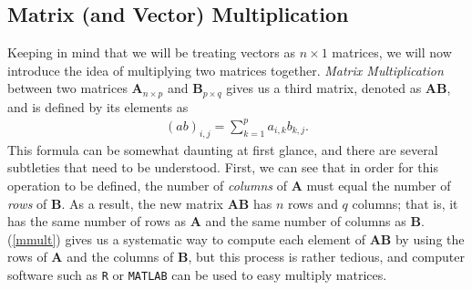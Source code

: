 \documentclass[10pt]{article}
\newcommand{\mydef}[1]{\textcolor{SteelBlue3}{\textit{#1}}} %
\begin{document}
\subsection{Matrix (and Vector) Multiplication}

Keeping in mind that we will be treating vectors as $n \times 1$ matrices, we will now introduce the idea of multiplying two matrices together. \mydef{Matrix Multiplication} between two matrices $\mathbf{A}_{n \times p}$ and $\mathbf{B}_{p \times q}$ gives us a third matrix, denoted as $\mathbf{AB}$, and is defined by its elements as 
\begin{align}
\label{mmult}
    (ab)_{i,j} = \sum_{k=1}^p a_{i,k} b_{k,j}.
\end{align}
This formula can be somewhat daunting at first glance, and there are several subtleties that need to be understood. First, we can see that in order for this operation to be defined, the number of \textit{columns} of $\mathbf{A}$ must equal the number of \textit{rows} of $\mathbf{B}$. As a result, the new matrix $\mathbf{AB}$ has $n$ rows and $q$ columns; that is, it has the same number of rows as $\mathbf{A}$ and the same number of columns as $\mathbf{B}$. (\ref{mmult}) gives us a systematic way to compute each element of $\mathbf{AB}$ by using the rows of $\mathbf{A}$ and the columns of $\mathbf{B}$, but this process is rather tedious, and computer software such as \texttt{R} or \texttt{MATLAB} can be used to easy multiply matrices.

\end{document}
